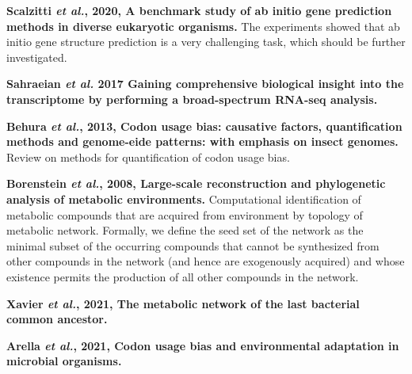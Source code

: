 \documentclass[11pt]{article}
\begin{document}
\begin{sloppypar}
\par
\textbf{Scalzitti \textit{et al.}, 2020, A benchmark study of ab initio gene prediction methods in diverse eukaryotic organisms.} \newline
The experiments showed that ab initio gene structure prediction is a very challenging task, which should be further investigated. 
\par
\textbf{Sahraeian \textit{et al.} 2017 Gaining comprehensive biological insight into the transcriptome by performing a broad-spectrum RNA-seq analysis.} \newline
\par
\textbf{Behura \textit{et al.}, 2013, Codon usage bias: causative factors, quantification methods and genome-eide patterns: with emphasis on insect genomes.} \newline
Review on methods for quantification of codon usage bias.
\par
\textbf{Borenstein \textit{et al.}, 2008, Large-scale reconstruction and phylogenetic analysis of metabolic environments.} \newline
Computational identification of metabolic compounds that are acquired from environment by topology of metabolic network. 
Formally, we define the seed set of the network as the minimal subset of the occurring compounds that cannot be synthesized from other compounds in the network (and hence are exogenously acquired) and whose existence permits the production of all other compounds in the network.
\par
\textbf{Xavier \textit{et al.}, 2021, The metabolic network of the last bacterial common ancestor.} \newline
\par
\textbf{Arella \textit{et al.}, 2021, Codon usage bias and environmental adaptation in microbial organisms.} \newline
\par



\end{sloppypar}
\end{document}
